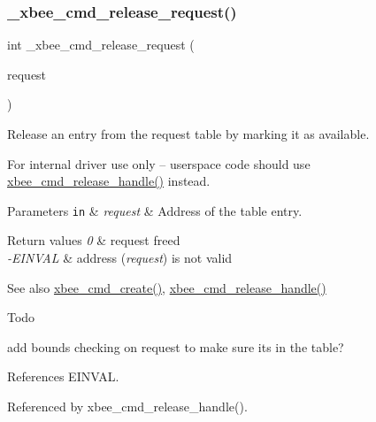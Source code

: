 \subsubsection{\texorpdfstring{\+\_\+xbee\+\_\+cmd\+\_\+release\+\_\+request()}{\_xbee\_cmd\_release\_request()}}
{\footnotesize\ttfamily int \+\_\+xbee\+\_\+cmd\+\_\+release\+\_\+request (\begin{DoxyParamCaption}\item[{\hyperlink{structxbee__cmd__request__t}{xbee\+\_\+cmd\+\_\+request\+\_\+t} \hyperlink{group__hal_gaef060b3456fdcc093a7210a762d5f2ed}{F\+AR} $\ast$}]{request }\end{DoxyParamCaption})}



Release an entry from the request table by marking it as available. 

For internal driver use only -- userspace code should use \hyperlink{group__xbee__atcmd_ga91641619ae34da34615193962ffd1525}{xbee\+\_\+cmd\+\_\+release\+\_\+handle()} instead.


\begin{DoxyParams}[1]{Parameters}
\mbox{\tt in}  & {\em request} & Address of the table entry.\\
\hline
\end{DoxyParams}

\begin{DoxyRetVals}{Return values}
{\em 0} & request freed \\
\hline
{\em -\/\+E\+I\+N\+V\+AL} & address ({\itshape request}) is not valid\\
\hline
\end{DoxyRetVals}
\begin{DoxySeeAlso}{See also}
\hyperlink{group__xbee__atcmd_gab73aaf873be6f9e515dcd65748a7f21c}{xbee\+\_\+cmd\+\_\+create()}, \hyperlink{group__xbee__atcmd_ga91641619ae34da34615193962ffd1525}{xbee\+\_\+cmd\+\_\+release\+\_\+handle()}
\end{DoxySeeAlso}
\begin{DoxyRefDesc}{Todo}
\item[\hyperlink{todo__todo000009}{Todo}]add bounds checking on request to make sure it\textquotesingle{}s in the table? \end{DoxyRefDesc}


References E\+I\+N\+V\+AL.



Referenced by xbee\+\_\+cmd\+\_\+release\+\_\+handle().

\mbox{\label{group__xbee__atcmd_ga0828601d6b2735ee9f2ebf408d12c05c}} 
